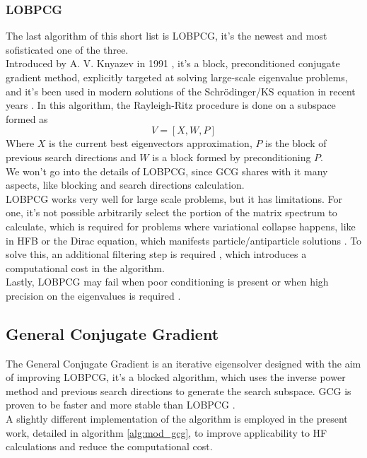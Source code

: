 \subsubsection{LOBPCG}
The last algorithm of this short list is LOBPCG, it's the newest and most sofisticated one of the three.
\\Introduced by A. V. Knyazev in 1991 \cite{LOBPCG}, it's a block, preconditioned conjugate gradient method, explicitly targeted at solving large-scale eigenvalue problems, and it's been used in modern solutions of the Schr\"odinger/KS equation in recent years \cite{LOBPCGDKS,Nottoli2023,LIN2013205,li2020efficient}.
In this algorithm, the Rayleigh-Ritz procedure is done on a subspace formed as
\begin{equation}
    \label{eq:LOBPCG_search_subspace}
    V = [X, W, P]
\end{equation}
Where $X$ is the current best eigenvectors approximation, $P$ is the block of previous search directions and $W$ is a block formed by preconditioning $P$.
\\We won't go into the details of LOBPCG, since GCG shares with it many aspects, like blocking and search directions calculation.
\\LOBPCG works very well for large scale problems, but it has limitations. 
For one, it's not possible arbitrarily select the portion of the matrix spectrum to calculate, which is required for problems where variational collapse happens, like in HFB or the Dirac equation, which manifests particle/antiparticle solutions \cite{li2020efficient}.
To solve this, an additional filtering step is required \cite{LIN2013205,li2020efficient}, which introduces a computational cost in the algorithm.
\\Lastly, LOBPCG may fail when poor conditioning is present or when high precision on the eigenvalues is required \cite{GCG1}.
\subsection{General Conjugate Gradient}
The General Conjugate Gradient is an iterative eigensolver designed with the aim of improving LOBPCG, it's a blocked algorithm, which uses the inverse power method and previous search directions to generate the search subspace. GCG is proven to be faster and more stable than LOBPCG \cite{GCG1}.
\\A slightly different implementation of the algorithm is employed in the present work, detailed in algorithm \ref{alg:mod_gcg}, to improve applicability to HF calculations and reduce the computational cost.
